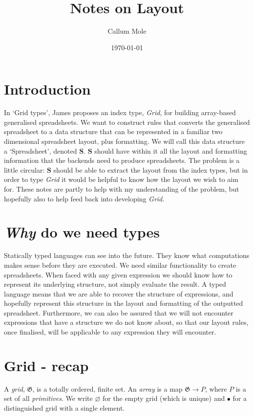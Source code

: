 \documentclass[11pt]{article}
\author{Callum Mole}
\date{\today}
\title{Notes on Layout}
\newcommand{\gr}[1]{\mathfrak{#1}}
\newcommand{\void}{\varnothing}
\newcommand{\unit}{\bullet}
\begin{document}
\maketitle

\section{Introduction}

In `Grid types', James proposes an index type, \textit{Grid}, for building array-based generalised spreadsheets. We want to construct rules that converts the generalised spreadsheet to a data structure that can be represented in a familiar two dimensional spreadsheet layout, plus formatting. We will call this data structure a  `Spreadsheet', denoted $\mathbf{S}$. $\mathbf{S}$  should have within it all the layout and formatting information that the backends need to produce spreadsheets. The problem is a little circular: $\mathbf{S}$ should be able to extract the layout from the index types, but in order to type \textit{Grid} it would be helpful to know how the layout we wish to aim for. These notes are partly to help with my understanding of the problem, but hopefully also to help feed back into developing \textit{Grid}.


\section{\emph{Why} do we need types}

Statically typed languages can see into the future. They know what computations makes sense before they are executed. We need similar functionality to create spreadsheets. When faced with any given expression we should know how to represent its underlying structure, not simply evaluate the result. A typed language means that we are able to recover the structure of expressions, and hopefully represent this structure in the layout and formatting of the outputted spreadsheet. Furthermore, we can also be assured that we will not encounter expressions that have a structure we do not know about, so that our layout rules, once finalised, will be applicable to any expression they will encounter.


\section{Grid - recap}

A \emph{grid}, \(\gr{G}\), is a totally ordered, finite set. An \emph{array} is a map $\gr{G} \to P$, where  \(P\) is a set of all \emph{primitives}. We write \(\void\) for the empty grid (which is unique) and $\unit$ for a distinguished grid with a single element. 
\end{document}
